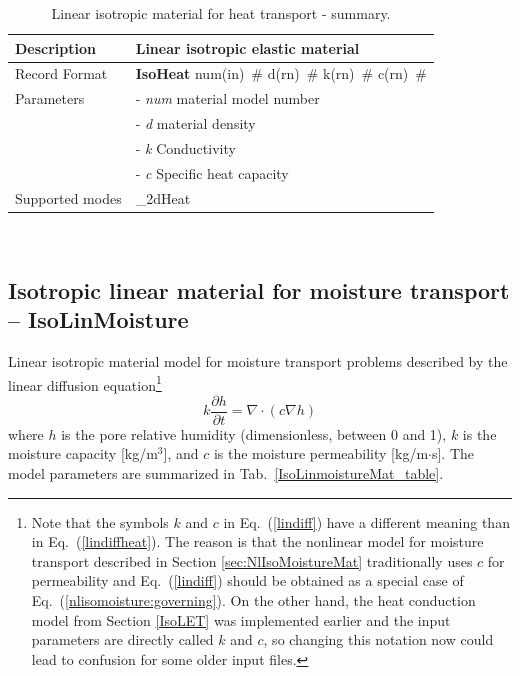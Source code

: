 \documentclass[a4paper]{article}
\newcommand{\descitem}[1]{{\noindent \bf #1}}
\newcommand{\elemparam}[2]{{{#1\tiny (#2)}~\#}}
\newcommand{\param}[1]{{\it #1}}
\newcommand{\refeq}[1]{Eq.~(\ref{#1})}
\newenvironment{mmt}{\begin{tabular}{|l|p{9cm}|}}{\end{tabular}\\}
\newenvironment{mmt}{\begin{tabular}{|l|l|}}{\end{tabular}\\}
\begin{document}
\begin{table}[!htb]
\begin{mmt}
\hline
Description & Linear isotropic elastic material\\
\hline
Record Format & \descitem{IsoHeat} \elemparam{num}{in}
\elemparam{d}{rn} \elemparam{k}{rn} \elemparam{c}{rn}\\
Parameters &- \param{num} material model number\\
&- \param{d} material density\\
&- \param{k} Conductivity\\
&- \param{c} Specific heat capacity\\
Supported modes& \_2dHeat\\
\hline
\end{mmt}
\caption{Linear isotropic material for heat transport - summary.}
\label{Isoheat_table}
\end{table}


\subsection{Isotropic linear material for moisture transport -- IsoLinMoisture}
\label{IsoLinMoistureMat}
Linear isotropic material model for moisture transport problems described
by the linear diffusion equation\footnote{Note that the symbols $k$ and $c$
in \refeq{lindiff} have a different meaning than in \refeq{lindiffheat}.
The reason is that the nonlinear model for moisture transport described
in Section \ref{sec:NlIsoMoistureMat} traditionally
uses $c$ for permeability and \refeq{lindiff} should be obtained
as a special case of \refeq{nlisomoisture:governing}. 
On the other hand, the heat conduction model
from Section \ref{IsoLET} was implemented earlier and the input parameters
are directly called $k$ and $c$, so changing this notation now could lead
to confusion for some older input files.}
\begin{equation}\label{lindiff}
k\frac{\partial h}{\partial t} = \nabla \cdot \left( c \nabla h \right)
\end{equation}
where $h$ is the pore relative humidity (dimensionless, between 0 and 1), 
$k$ is the moisture capacity [kg/m$^3$],
and $c$ is the moisture permeability [kg/m$\cdot$s].
The model parameters are summarized
in Tab.~\ref{IsoLinmoistureMat_table}.
\end{document}
